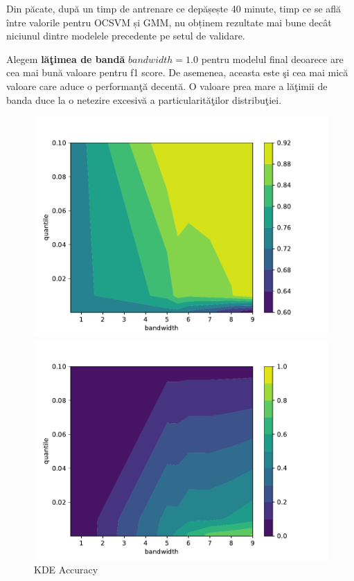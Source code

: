 Din păcate, după un timp de antrenare ce depășește 40 minute, 
timp ce se află între valorile pentru OCSVM și GMM, nu obținem 
rezultate mai bune decât niciunul dintre modelele precedente
pe setul de validare. 

Alegem \textbf{lăţimea de bandă} $bandwidth=1.0$ pentru modelul final deoarece are cea
mai bună valoare pentru f1 score. De asemenea, aceasta este şi cea mai mică valoare 
care aduce o performanţă decentă. O valoare prea mare a lăţimii de banda duce 
la o netezire excesivă a particularităţilor distribuţiei.

\begin{figure}[p] %
    \begin{minipage}[t]{0.5\textwidth}
        \vspace{0pt}
        \includegraphics[width=\textwidth]{images/kde-accuracy.pdf}
        \caption{KDE Accuracy}
    \end{minipage}
    \hfill
    \begin{minipage}[t]{0.5\textwidth}
        \vspace{0pt}
        \includegraphics[width=\textwidth]{images/kde-precision.pdf}

\end{minipage}
\end{figure}
